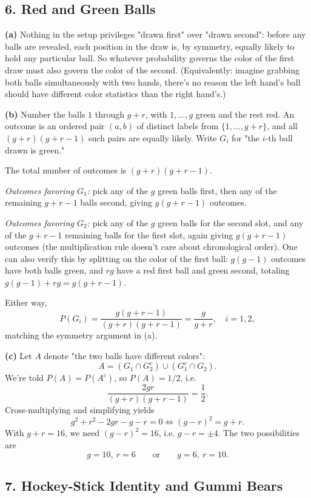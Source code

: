 \documentclass{article}
\begin{document}
\subsection*{6. Red and Green Balls}

\textbf{(a)} Nothing in the setup privileges "drawn first" over "drawn second": before any balls are revealed, each position in the draw is, by symmetry, equally likely to hold any particular ball. So whatever probability governs the color of the first draw must also govern the color of the second. (Equivalently: imagine grabbing both balls simultaneously with two hands, there's no reason the left hand's ball should have different color statistics than the right hand's.)

\medskip
\textbf{(b)} Number the balls $1$ through $g+r$, with $1,\dots,g$ green and the rest red. An outcome is an ordered pair $(a,b)$ of distinct labels from $\{1,\dots,g+r\}$, and all $(g+r)(g+r-1)$ such pairs are equally likely. Write $G_i$ for "the $i$-th ball drawn is green."

The total number of outcomes is $(g+r)(g+r-1)$.

\emph{Outcomes favoring $G_1$:} pick any of the $g$ green balls first, then any of the remaining $g+r-1$ balls second, giving $g(g+r-1)$ outcomes.

\emph{Outcomes favoring $G_2$:} pick any of the $g$ green balls for the second slot, and any of the $g+r-1$ remaining balls for the first slot, again giving $g(g+r-1)$ outcomes (the multiplication rule doesn't care about chronological order). One can also verify this by splitting on the color of the first ball: $g(g-1)$ outcomes have both balls green, and $rg$ have a red first ball and green second, totaling $g(g-1)+rg = g(g+r-1)$.

Either way,
$$P(G_i) = \frac{g(g+r-1)}{(g+r)(g+r-1)} = \frac{g}{g+r}, \quad i=1,2,$$
matching the symmetry argument in (a).

\medskip
\textbf{(c)} Let $A$ denote "the two balls have different colors":
$$A = (G_1 \cap G_2^c) \cup (G_1^c \cap G_2).$$
We're told $P(A) = P(A^c)$, so $P(A)=1/2$, i.e.
$$\frac{2gr}{(g+r)(g+r-1)} = \frac{1}{2}.$$
Cross-multiplying and simplifying yields
$$g^2 + r^2 - 2gr - g - r = 0 \iff (g-r)^2 = g+r.$$
With $g+r=16$, we need $(g-r)^2=16$, i.e. $g-r = \pm 4$. The two possibilities are
$$g=10,\ r=6 \qquad\text{or}\qquad g=6,\ r=10.$$

\subsection*{7. Hockey-Stick Identity and Gummi Bears}
\end{document}
